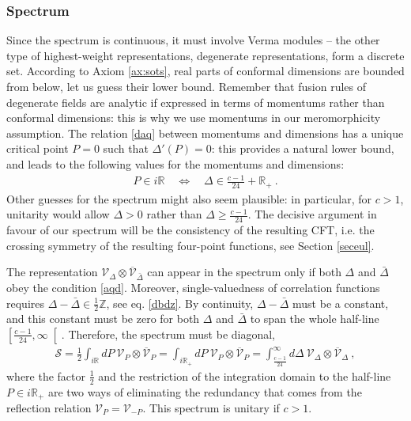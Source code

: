 \documentclass[12pt, a4paper, notitlepage, twoside]{report}
\numberwithin{equation}{section}
\theoremstyle{break}
\begin{document}
\subsubsection{Spectrum}

Since the spectrum is continuous, it must involve Verma modules -- the other type of highest-weight representations, degenerate representations, form a discrete set. 
According to Axiom \ref{ax:sots}, real parts of conformal dimensions are bounded from below, let us guess their lower bound. Remember that fusion rules of degenerate fields are analytic if expressed in terms of momentums rather than conformal dimensions: this is why we use momentums in our meromorphicity assumption. The relation \eqref{daq} between momentums and dimensions has a unique critical point $P=0$ such that $\Delta'(P)=0$: this provides a natural lower bound, and leads to the following values for the momentums and dimensions:
\begin{align}
 P \in i{\mathbb{R}} \quad \iff \quad \Delta \in \frac{c-1}{24}+\mathbb{R}_+\ .
\label{aqd}
\end{align}
Other guesses for the spectrum might also seem plausible: in particular, for $c>1$, unitarity would allow $\Delta> 0$ rather than $\Delta \geq \frac{c-1}{24}$. 
The decisive argument in favour of our spectrum will be the consistency of the resulting CFT, i.e. 
the crossing symmetry of the resulting four-point functions, see Section \ref{seceul}.

The representation $\mathcal{V}_\Delta\otimes \overline{\mathcal{V}}_{\bar{\Delta}}$ can appear in the spectrum only if both 
$\Delta$ and $\bar{\Delta}$ obey the condition \eqref{aqd}. 
Moreover, single-valuedness of correlation functions requires $\Delta-\bar{\Delta}\in {\frac12\mathbb{Z}} $, see eq. \eqref{dbdz}.
By continuity, $\Delta-\bar{\Delta}$ must be a constant, and this constant must be zero for both $\Delta$ and $\bar{\Delta}$ to span the whole half-line $\left[\frac{c-1}{24},\infty\right[$.
Therefore, the spectrum must be diagonal,
\begin{align}
 \boxed{ \mathcal{S}= \frac12\int_{i{\mathbb{R}}} dP\ \mathcal{V}_P \otimes \overline{\mathcal{V}}_P =\int_{i{\mathbb{R}_+}} dP\ \mathcal{V}_P \otimes \overline{\mathcal{V}}_P = \int_{\frac{c-1}{24}}^\infty d\Delta\ \mathcal{V}_\Delta\otimes \overline{\mathcal{V}}_\Delta} \ ,
\label{sad}
\end{align}
where the  factor $\frac12$ and the restriction of the integration domain to the half-line $P\in i\mathbb{R}_+$ are two ways of
eliminating the redundancy that comes from the reflection relation $\mathcal{V}_P=\mathcal{V}_{-P}$. This spectrum is unitary if $c>1$.
\end{document}
